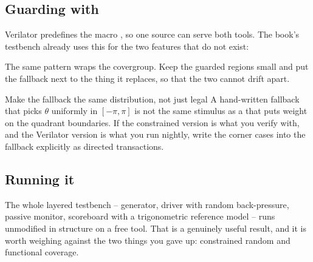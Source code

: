 \subsection{Guarding with }

Verilator predefines the macro
, so one source can serve both tools. The book's testbench
already uses this for the two features that do not exist:


The same pattern wraps the covergroup. Keep the guarded regions small and put
the fallback next to the thing it replaces, so that the two cannot drift apart.

\begin{tipbox}{Make the fallback the same distribution, not just legal}
A hand-written fallback that picks $\theta$ uniformly in $[-\pi, \pi]$ is not
the same stimulus as a  that puts weight on the quadrant
boundaries. If the constrained version is what you verify with, and the
Verilator version is what you run nightly, write the corner cases into the
fallback explicitly as directed transactions.
\end{tipbox}

\subsection{Running it}


The whole layered testbench -- generator, driver with random back-pressure,
passive monitor, scoreboard with a trigonometric reference model -- runs
unmodified in structure on a free tool. That is a genuinely useful result, and
it is worth weighing against the two things you gave up: constrained random
and functional coverage.

